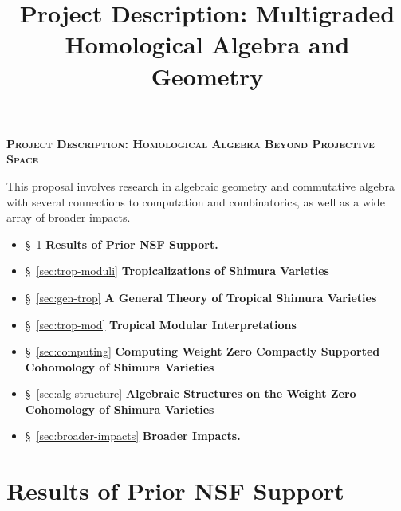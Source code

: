 \documentclass[11pt,reqno]{amsart}
\title{Project Description: Multigraded Homological Algebra and Geometry}
\theoremstyle{remark}
\begin{document}
 

\thispagestyle{empty}
\pagestyle{empty}
\begingroup  
  \centering
  \large\scshape\bfseries Project Description: Homological Algebra Beyond Projective Space\\[1em]
\endgroup


\setcounter{section}{0}

\noindent This proposal involves research in algebraic geometry and commutative algebra with several connections to computation and combinatorics, as well as a wide array of broader impacts.
\begin{itemize}[leftmargin=*]
	\item \S~\ref{sec:prior-work} \textbf{Results of Prior NSF Support.} 
	\item \S~\ref{sec:trop-moduli} \textbf{Tropicalizations of Shimura Varieties}
	\item \S~\ref{sec:gen-trop} \textbf{A General Theory of Tropical Shimura Varieties}
	\item \S~\ref{sec:trop-mod} \textbf{Tropical Modular Interpretations}
	\item \S~\ref{sec:computing} \textbf{Computing Weight Zero Compactly Supported Cohomology of Shimura Varieties}
	\item \S~\ref{sec:alg-structure} \textbf{Algebraic Structures on the Weight Zero Cohomology of Shimura Varieties}
	\item \S~\ref{sec:broader-impacts} \textbf{Broader Impacts.}
\end{itemize}

\section{Results of Prior NSF Support}\label{sec:prior-work}
\end{document}
